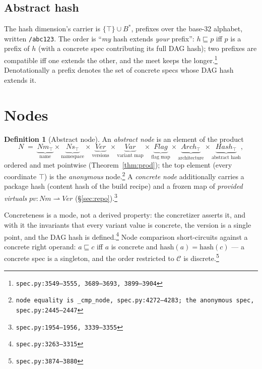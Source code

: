 \documentclass[11pt]{article}
\theoremstyle{definition}
\newtheorem{definition}[theorem]{Definition}
\theoremstyle{remark}
\newcommand{\sat}{\sqsubseteq}
\newcommand{\Conc}{\mathcal{C}}
\newcommand{\Names}{\mathit{Nm}}
\newcommand{\code}[1]{\texttt{#1}}
\newcommand{\src}[1]{\footnote{\code{#1}}}
\begin{document}
\subsection{Abstract hash}

The hash dimension's carrier is $\{\top\} \cup B^{*}$, prefixes over the
base-32 alphabet, written \code{/abc123}.  The order is
``\emph{my} hash extends \emph{your} prefix'': $h \sat p$ iff $p$ is a prefix
of $h$ (with a concrete spec contributing its full DAG hash); two prefixes are
compatible iff one extends the other, and the meet keeps the
longer.\src{spec.py:3549--3555, 3689--3693, 3899--3904}  Denotationally a
prefix denotes the set of concrete specs whose DAG hash extends it.

\section{Nodes}\label{sec:nodes}

\begin{definition}[Abstract node]\label{def:node}
An \emph{abstract node} is an element of the product
\[
  N \;=\;
  \underbrace{\Names_\top}_{\text{name}} \times
  \underbrace{\mathit{Ns}_\top}_{\text{namespace}} \times
  \underbrace{\mathit{Ver}}_{\text{versions}} \times
  \underbrace{\mathit{Var}}_{\text{variant map}} \times
  \underbrace{\mathit{Flag}}_{\text{flag map}} \times
  \underbrace{\mathit{Arch}_\top}_{\text{architecture}} \times
  \underbrace{\mathit{Hash}_\top}_{\text{abstract hash}},
\]
ordered and met pointwise (Theorem~\ref{thm:prod}); the top element (every
coordinate $\top$) is the \emph{anonymous} node.\src{node equality is
\code{\_cmp\_node}, spec.py:4272--4283; the anonymous spec, spec.py:2445--2447}
A \emph{concrete node} additionally carries a package hash (content hash of
the build recipe) and a frozen map of \emph{provided virtuals}
$\mathit{pv} : \Names \rightharpoonup \mathit{Ver}$
(\S\ref{sec:repo}).\src{spec.py:1954--1956, 3339--3355}
\end{definition}

Concreteness is a mode, not a derived property: the concretizer asserts it,
and with it the invariants that every variant value is concrete, the version
is a single point, and the DAG hash is defined.\src{spec.py:3263--3315}  Node
comparison short-circuits against a concrete right operand: $a \sat c$ iff
$a$ is concrete and $\mathrm{hash}(a) = \mathrm{hash}(c)$ --- a concrete spec
is a singleton, and the order restricted to $\Conc$ is
discrete.\src{spec.py:3874--3880}
\end{document}
